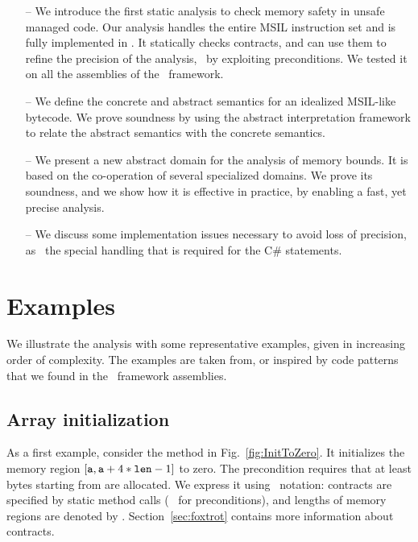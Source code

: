 \documentclass[10pt]{sigplanconf}
\begin{document}
\begin{itemize}
\item[--] We introduce the first static analysis to check memory safety in unsafe managed code.
  Our analysis handles the entire MSIL instruction set and is fully implemented in \Clousot.
  It statically checks contracts, and can use them to refine the precision of the analysis, \eg\ by exploiting preconditions.
  We tested it on all the assemblies of the \NET\ framework.
\item[--] We define the concrete and abstract semantics for an idealized MSIL-like bytecode.
  We prove  soundness by using the abstract interpretation framework to relate the abstract semantics with the concrete semantics. 
\item[--] We present a new abstract domain for the analysis of memory bounds. 
  It is based on the co-operation of several specialized domains. We prove its soundness, and we show how it is effective in practice, by enabling a fast, yet precise analysis.
\item[--] We discuss some implementation issues necessary to avoid
  loss of precision, as \eg\ the special handling that is required for
  the C\#  statements.
\end{itemize}

\section{Examples}

We illustrate the analysis with some representative examples, given in increasing order of complexity.
The examples are taken from, or inspired by code patterns that we
found in the \NET\ framework assemblies.

\subsection{Array initialization}
As a first example, consider the  method in
Fig.~\ref{fig:InitToZero}.  It initializes the memory region
$[\mathtt{a}, \mathtt{a} + 4 * \mathtt{len} - 1]$ to zero.  The precondition
requires that at least  bytes starting from
 are allocated.  We express it using \Foxtrot\ notation:
contracts are specified by static method calls (\eg\
 for preconditions), and lengths of
memory regions are denoted by \code{Contract.}
\code{(\dots)}.
Section~\ref{sec:foxtrot} contains more information about contracts.
\end{document}
